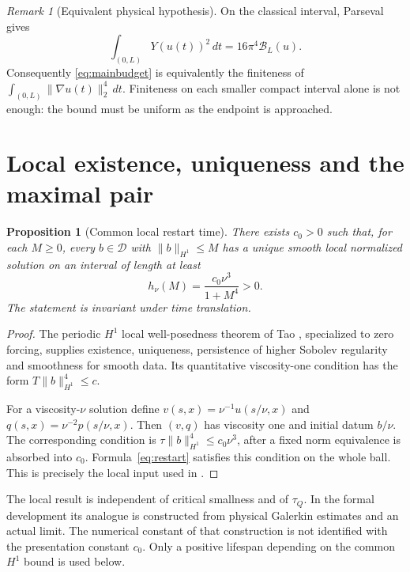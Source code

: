 \documentclass[11pt,a4paper]{article}
\numberwithin{equation}{section}
\theoremstyle{plain}
\newtheorem{proposition}[theorem]{Proposition}
\theoremstyle{definition}
\theoremstyle{remark}
\newtheorem{remark}[theorem]{Remark}
\newcommand{\D}{\mathcal D}
\newcommand{\norm}[2]{\lVert #1\rVert_{#2}}
\newcommand{\tq}{\tau_Q}
\newcommand{\Budget}{\mathcal B}
\begin{document}
\begin{remark}[Equivalent physical hypothesis]\label{rem:physical}
On the classical interval, Parseval gives
\begin{equation}\label{eq:budgetconversion}
 \int_{(0,L)}Y(u(t))^2\,dt=16\pi^4\Budget_L(u).
\end{equation}
Consequently \eqref{eq:mainbudget} is equivalently the finiteness of
$\int_{(0,L)}\norm{\nabla u(t)}{2}^4\,dt$. Finiteness on each smaller compact
interval alone is not enough: the bound must be uniform as the endpoint is
approached.
\end{remark}

\section{Local existence, uniqueness and the maximal pair}\label{sec:local}
\begin{proposition}[Common local restart time]\label{prop:local}
There exists $c_0>0$ such that, for each $M\ge0$, every $b\in\D$ with
$\norm{b}{H^1}\le M$ has a unique smooth local normalized solution on an
interval of length at least
\begin{equation}\label{eq:restart}
 h_\nu(M)=\frac{c_0\nu^3}{1+M^4}>0.
\end{equation}
The statement is invariant under time translation.
\end{proposition}
\begin{proof}
The periodic $H^1$ local well-posedness theorem of Tao
\cite[Theorem~5.1, pp.~48--49]{tao}, specialized to zero forcing, supplies
existence, uniqueness, persistence of higher Sobolev regularity and
smoothness for smooth data. Its quantitative viscosity-one condition has
the form $T\norm{b}{H^1}^4\le c$.

For a viscosity-$\nu$ solution define
$v(s,x)=\nu^{-1}u(s/\nu,x)$ and $q(s,x)=\nu^{-2}p(s/\nu,x)$.
Then $(v,q)$ has viscosity one and initial datum $b/\nu$. The corresponding
condition is $\tau\norm{b}{H^1}^4\le c_0\nu^3$, after a fixed norm
equivalence is absorbed into $c_0$. Formula~\eqref{eq:restart} satisfies
this condition on the whole ball. This is precisely the local input used
in \cite[Proposition~3.1]{small}.
\end{proof}

The local result is independent of critical smallness and of $\tq$.
In the formal development its analogue is constructed from physical
Galerkin estimates and an actual limit. The numerical constant of that
construction is not identified with the presentation constant $c_0$.
Only a positive lifespan depending on the common $H^1$ bound is used below.
\end{document}
